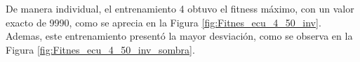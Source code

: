 \documentclass[conference]{IEEEtran}
\begin{document}
De manera individual, el entrenamiento 4 obtuvo el fitness máximo, con un valor exacto de 9990, como se aprecia en la Figura \ref{fig:Fitnes_ecu_4_50_inv}. Ademas, este entrenamiento presentó la mayor desviación, como se observa en la Figura \ref{fig:Fitnes_ecu_4_50_inv_sombra}.\\


\end{document}

